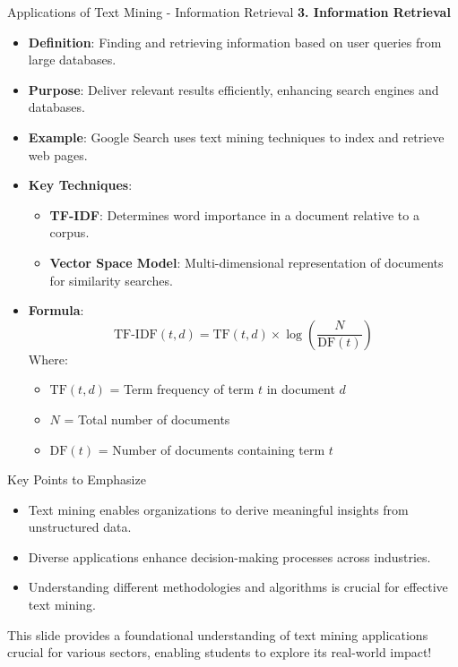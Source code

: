 \documentclass[aspectratio=169]{beamer}
\begin{document}
\begin{frame}[fragile]{Applications of Text Mining - Information Retrieval}
    \textbf{3. Information Retrieval}
    \begin{itemize}
        \item \textbf{Definition}: Finding and retrieving information based on user queries from large databases.
        \item \textbf{Purpose}: Deliver relevant results efficiently, enhancing search engines and databases.
        \item \textbf{Example}: Google Search uses text mining techniques to index and retrieve web pages.
        \item \textbf{Key Techniques}:
        \begin{itemize}
            \item \textbf{TF-IDF}: Determines word importance in a document relative to a corpus.
            \item \textbf{Vector Space Model}: Multi-dimensional representation of documents for similarity searches.
        \end{itemize}
        \item \textbf{Formula}:
        \begin{equation}
            \text{TF-IDF}(t, d) = \text{TF}(t, d) \times \log\left(\frac{N}{\text{DF}(t)}\right)
        \end{equation}
        Where:
        \begin{itemize}
            \item \( \text{TF}(t, d) \) = Term frequency of term \( t \) in document \( d \)
            \item \( N \) = Total number of documents
            \item \( \text{DF}(t) \) = Number of documents containing term \( t \)
        \end{itemize}
    \end{itemize}
\end{frame}

\begin{frame}[fragile]{Key Points to Emphasize}
    \begin{itemize}
        \item Text mining enables organizations to derive meaningful insights from unstructured data.
        \item Diverse applications enhance decision-making processes across industries.
        \item Understanding different methodologies and algorithms is crucial for effective text mining.
    \end{itemize}
    This slide provides a foundational understanding of text mining applications crucial for various sectors, enabling students to explore its real-world impact!
\end{frame}
\end{document}
